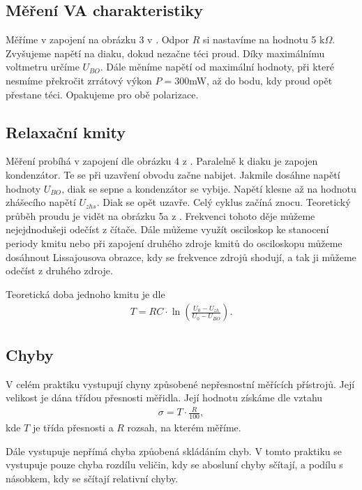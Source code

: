 \documentclass[a4paper,12pt]{article}
\begin{document}
\subsection{Měření VA charakteristiky}
    Měříme v zapojení na obrázku 3 v \cite{text}. Odpor $R$ si nastavíme na hodnotu 5 k$\Omega$. Zvyšujeme napětí 
    na diaku, dokud nezačne téci proud. Díky maximálnímu voltmetru určíme $U_{BO}$. Dále měníme napětí od maximální 
    hodnoty, při které nesmíme překročit zrrátový výkon $P= 300$mW, až do bodu, kdy proud opět přestane téci. Opakujeme 
    pro obě polarizace.

\subsection{Relaxační kmity}
    Měření probíhá v zapojení dle obrázku 4 z \cite{text}. Paralelně k diaku je zapojen kondenzátor. Te se při uzavření obvodu 
    začne nabijet. Jakmile dosáhne napětí hodnoty $U_{BO}$, diak se sepne a kondenzátor se vybije. Napětí klesne až na hodnotu 
    zhášecího napětí $U_{zhs}$. Diak se opět uzavře. Celý cyklus začíná znocu. Teoretický průběh proudu je vidět na obrázku 5a z 
    \cite{text}. Frekvenci tohoto děje můžeme nejejdnodušeji odečíst z čítače. Dále můžeme využít osciloskop ke stanocení periody 
    kmitu nebo při zapojení druhého zdroje kmitů do osciloskopu můžeme dosáhnout Lissajousova obrazce, kdy se frekvence zdrojů 
    shodují, a tak ji můžeme odečíst z druhého zdroje.

    Teoretická doba jednoho kmitu je dle \cite{text}
    \begin{eqnarray}
    T=RC\cdot\ln\left(\frac{U_0-U_{zh}}{U_0-U_{BO}}\right).
    \label{T}
    \end{eqnarray}

\subsection{Chyby}
    V celém praktiku vystupují chyny způsobené nepřesnostní měřících přístrojů. Její velikost je dána třídou přesnosti měřidla.
    Její hodnotu získáme dle vztahu
    \begin{eqnarray}
    \sigma = T\cdot \frac{R}{100},
    \end{eqnarray}
    kde $T$ je třída přesnosti a $R$ rozsah, na kterém měříme.

    Dále vystupuje nepřímá chyba způobená skládáním chyb. V tomto praktiku se vystupuje pouze chyba rozdílu veličin, kdy se abosluní
    chyby sčítají, a podílu s násobkem, kdy se sčítají relativní chyby.
\end{document}
